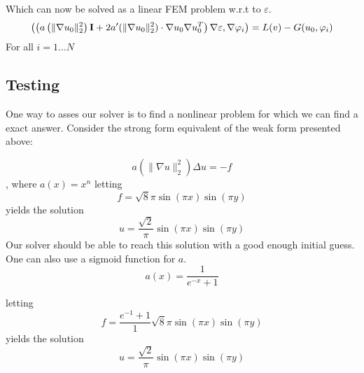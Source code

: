 \documentclass[a4paper]{article}
\begin{document}
Which can now be solved as a linear FEM problem w.r.t to $\varepsilon$.
\begin{equation}
\left( \left(a\left(\|\nabla u_0 \|_2^2\right)\mathbf{I}+2a'(\|\nabla u_0\|_2^2)\cdot \nabla u_0 \nabla u_0^T\right)\nabla \varepsilon,\nabla \varphi_i \right) = L(v)-G(u_0,\varphi_i) \\
\end{equation}
For all $i=1\ldots N$

\subsection*{Testing}
One way to asses our solver is to find a nonlinear problem for which we can find a exact answer. 
Consider the strong form equivalent of the weak form presented above:

\begin{equation*}
a\left(\|\nabla u \|_2^2\right)\Delta u = -f 
\end{equation*},
where $a(x)=x^n$
letting
\begin{equation*}
	f = \sqrt{8}\pi \sin(\pi x)\sin(\pi y)  
\end{equation*}
yields the solution
\begin{equation*}
	u = \frac{\sqrt{2}}{\pi} \sin(\pi x)\sin(\pi y)
\end{equation*}
Our solver should be able to reach this solution with a good enough initial guess.
One can also use a sigmoid function for $a$.
\begin{equation*}
	a(x)=\frac{1}{e^{-x}+1}
\end{equation*}


letting
\begin{equation*}
	f = \frac{e^{-1}+1}{1}\sqrt{8}\pi \sin(\pi x)\sin(\pi y)  
\end{equation*}
yields the solution
\begin{equation*}
	u = \frac{\sqrt{2}}{\pi} \sin(\pi x)\sin(\pi y)
\end{equation*}




\clearpage
%
\end{document}
